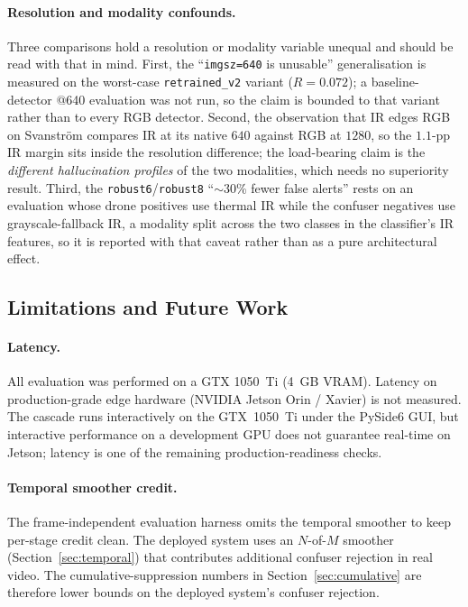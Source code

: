 \paragraph{Resolution and modality confounds.}
Three comparisons hold a resolution or modality variable unequal and should be read with that in mind. First, the ``\texttt{imgsz=640} is unusable'' generalisation is measured on the worst-case \texttt{retrained\_v2} variant ($R=0.072$); a baseline-detector @640 evaluation was not run, so the claim is bounded to that variant rather than to every RGB detector. Second, the observation that IR edges RGB on Svanstr\"om compares IR at its native $640$ against RGB at $1280$, so the $1.1$-pp IR margin sits inside the resolution difference; the load-bearing claim is the \emph{different hallucination profiles} of the two modalities, which needs no superiority result. Third, the \texttt{robust6}/\texttt{robust8} ``$\sim$30\% fewer false alerts'' rests on an evaluation whose drone positives use thermal IR while the confuser negatives use grayscale-fallback IR, a modality split across the two classes in the classifier's IR features, so it is reported with that caveat rather than as a pure architectural effect.

\subsection{Limitations and Future Work}
\label{sec:limits}

\paragraph{Latency.}
All evaluation was performed on a GTX 1050~Ti (4~GB VRAM). Latency on production-grade edge hardware (NVIDIA Jetson Orin / Xavier) is not measured. The cascade runs interactively on the GTX~1050~Ti under the PySide6 GUI, but interactive performance on a development GPU does not guarantee real-time on Jetson; latency is one of the remaining production-readiness checks.

\paragraph{Temporal smoother credit.}
The frame-independent evaluation harness omits the temporal smoother to keep per-stage credit clean. The deployed system uses an $N$-of-$M$ smoother (Section~\ref{sec:temporal}) that contributes additional confuser rejection in real video. The cumulative-suppression numbers in Section~\ref{sec:cumulative} are therefore lower bounds on the deployed system's confuser rejection.

